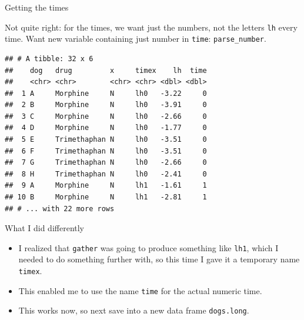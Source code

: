 \documentclass[
  ignorenonframetext,
]{beamer}
\newenvironment{Shaded}{\begin{snugshade}}{\end{snugshade}}
\newcommand{\DataTypeTok}[1]{\textcolor[rgb]{0.13,0.29,0.53}{#1}}
\newcommand{\KeywordTok}[1]{\textcolor[rgb]{0.13,0.29,0.53}{\textbf{#1}}}
\newcommand{\NormalTok}[1]{#1}
\newcommand{\OperatorTok}[1]{\textcolor[rgb]{0.81,0.36,0.00}{\textbf{#1}}}
\newcommand{\StringTok}[1]{\textcolor[rgb]{0.31,0.60,0.02}{#1}}
\begin{document}
\begin{frame}[fragile]{Getting the times}
\protect\hypertarget{getting-the-times}{}

Not quite right: for the times, we want just the numbers, not the
letters \texttt{lh} every time. Want new variable containing just number
in \texttt{time}: \texttt{parse\_number}.

\footnotesize

\begin{Shaded}
\end{Shaded}

\begin{verbatim}
## # A tibble: 32 x 6
##    dog   drug         x     timex    lh  time
##    <chr> <chr>        <chr> <chr> <dbl> <dbl>
##  1 A     Morphine     N     lh0   -3.22     0
##  2 B     Morphine     N     lh0   -3.91     0
##  3 C     Morphine     N     lh0   -2.66     0
##  4 D     Morphine     N     lh0   -1.77     0
##  5 E     Trimethaphan N     lh0   -3.51     0
##  6 F     Trimethaphan N     lh0   -3.51     0
##  7 G     Trimethaphan N     lh0   -2.66     0
##  8 H     Trimethaphan N     lh0   -2.41     0
##  9 A     Morphine     N     lh1   -1.61     1
## 10 B     Morphine     N     lh1   -2.81     1
## # ... with 22 more rows
\end{verbatim}

\normalsize

\end{frame}

\begin{frame}[fragile]{What I did differently}
\protect\hypertarget{what-i-did-differently}{}

\begin{itemize}
\item
  I realized that \texttt{gather} was going to produce something like
  \texttt{lh1}, which I needed to do something further with, so this
  time I gave it a temporary name \texttt{timex}.
\item
  This enabled me to use the name \texttt{time} for the actual numeric
  time.
\item
  This works now, so next save into a new data frame \texttt{dogs.long}.
\end{itemize}

\end{frame}
\end{document}

